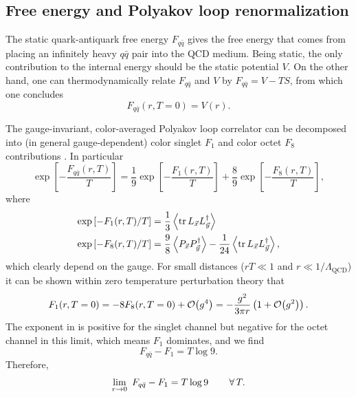 \subsection{Free energy and Polyakov loop renormalization}

The static quark-antiquark free energy $F_{q\bar{q}}$ gives the free
energy that comes from placing an infinitely heavy $q\bar{q}$ pair into the QCD
medium. Being static, the only contribution to the internal energy should be the
static potential $V$. On the other hand, one can thermodynamically relate
$F_{q\bar{q}}$ and $V$ by $F_{q\bar{q}}=V-TS$, from which one concludes
\begin{equation}
  F_{q\bar{q}}(r,T=0)=V(r).
\end{equation}

The gauge-invariant, color-averaged Polyakov loop correlator can be decomposed
into (in general gauge-dependent) color singlet $F_1$ and color octet $F_8$
contributions
\cite{mclerran_monte_1981,mclerran_quark_1981,nadkarni_non-abelian_1986}.
In particular
\begin{equation}\label{eq:channels}
  \exp\left[-\frac{F_{q\bar{q}}(r,T)}{T}\right]
  =\frac{1}{9}\exp\left[-\frac{F_1(r,T)}{T}\right]
   +\frac{8}{9}\exp\left[-\frac{F_8(r,T)}{T}\right],
\end{equation}
where
\begin{equation}\begin{aligned}
 \exp\left[-F_1(r,T)/T\right]
   &=\frac{1}{3}\ev{\tr L_{\vec{x}}L^\dagger_{\vec{y}}}\\
  \exp\left[-F_8(r,T)/T\right]
    &=\frac{9}{8}\ev{P_{\vec{x}}P^\dagger_{\vec{y}}}
     -\frac{1}{24}\ev{\tr L_{\vec{x}}L^\dagger_{\vec{y}}},
\end{aligned}\end{equation}
which clearly depend on the gauge.
For small distances ($rT\ll1$ and $r\ll1/\Lambda_{\text{QCD}}$) it can
be shown within zero temperature perturbation theory
\cite{kaczmarek_heavy_2002} that
\begin{equation}\label{eq:Fperturb}
  F_1(r,T=0)
            =-8F_8(r,T=0)+\order{g^4}
            =-\frac{g^2}{3\pi r}\left(1+\order{g^2}\right).
\end{equation}
The exponent in  is positive for the singlet channel
but negative for the octet channel in this limit, which means $F_1$ dominates,
and we find
\begin{equation}
  F_{q\bar{q}}-F_1=T\log 9.
\end{equation}
Therefore,
\begin{equation}\label{eq:Tlog9}
  \lim_{r\to0}~F_{q\bar{q}}-F_1=T\log 9\qquad\operatorname{\forall} T.
\end{equation}

